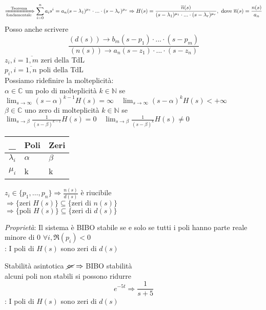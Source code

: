       \[
         \displaystyle\xRightarrow[\mathrm{fondamentale}]{\mathrm{Teorema}}\sum_{i = 0}^{n}a_is^i = a_n(s - \lambda_1)^{\mu_1}\cdot...\cdot(s - \lambda_r)^{\mu_r} \Rightarrow H(s) = \frac{\overline{n}(s)}{(s - \lambda_1)^{\mu_1}\cdot...\cdot(s - \lambda_r)^{\mu_r}}, \mathrm{\,\,dove\,\,}\overline{n}(s) = \frac{n(s)}{a_n}
      \]
      Posso anche scrivere
      \[
         \frac{(d(s)) \rightarrow b_m(s - p_1)\cdot...\cdot(s - p_m)}{(n(s)) \rightarrow a_n(s - z_1)\cdot...\cdot(s - z_n)}
      \]
      $z_i, i = \overline{1, m}$ zeri della TdL\\
      $p_i, i = \overline{1, n}$ poli della TdL\\
      Possiamo ridefinire la molteplicità:\\
      $\alpha\in\mathbb{C}$ un polo di molteplicità $k\in\mathbb{N}$ se $\displaystyle\lim_{s\to\infty}(s - \alpha)^{k - 1}H(s) = \infty\quad\lim_{s\to\infty}(s - \alpha)^kH(s) < +\infty$\\
      $\beta\in\mathbb{C}$ uno zero di molteplicità $k\in\mathbb{N}$ se $\displaystyle\lim_{s\to\beta}\frac{1}{(s - \beta)^{k - 1}}H(s) = 0\quad\lim_{s\to\beta}\frac{1}{(s - \beta)^k}H(s) \neq 0$
      \begin{center}
         \begin{tabular}{lll}
            \toprule
            \_ & Poli & Zeri \\
            \midrule
            $\lambda_i$ & $\alpha$ & $\beta$ \\
            $\mu_i$ & k & k \\
            \bottomrule
         \end{tabular}
      \end{center}
      \begin{osservazione}
         $z_i\in\{p_1,\dots,p_n\} \Rightarrow \frac{n(s)}{d(s)}$ è riucibile\\
         $\Rightarrow \{\mathrm{zeri\,\,}H(s)\} \subseteq \{\mathrm{zeri\,\,di\,\,}n(s)\}$\\
         $\Rightarrow \{\mathrm{poli\,\,}H(s)\} \subseteq \{\mathrm{zeri\,\,di\,\,}d(s)\}$
      \end{osservazione}
      \emph{Proprietà}: Il sistema è BIBO stabile se e solo se tutti i poli hanno parte reale minore di 0 $\forall i, \Re(p_i) < 0$\\
      \NB: I poli di $H(s)$ sono zeri di $d(s)$
\begin{osservazione}
  Stabilità asintotica $\cancel{\Leftarrow}\Rightarrow$ BIBO stabilità\\
  alcuni poli non stabili si possono ridurre\\
  \[
    e^{-5t} \Rightarrow \frac{1}{s + 5}
  \]
  \NB: I poli di $H(s)$ sono zeri di $d(s)$
\end{osservazione}
